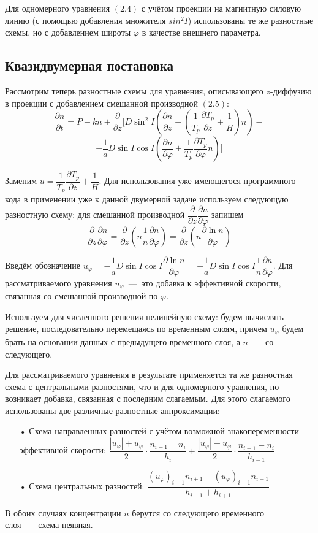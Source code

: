 \documentclass[14pt, a4paper, fleqn]{extarticle}
\begin{document}
Для одномерного уравнения $(2.4)$ с учётом проекции на магнитную силовую линию (с помощью добавления множителя $sin^2 I$) использованы те же разностные схемы, но с добавлением широты $\varphi$ в качестве внешнего параметра.



\subsection{Квазидвумерная постановка}

Рассмотрим теперь разностные схемы для уравнения, описывающего $z$-диффузию в проекции с добавлением смешанной производной $(2.5)$:$$\dfrac{\partial n}{\partial t} =P-kn+\dfrac{\partial}{\partial z}\biggl[D\sin^2 I\left(\dfrac{\partial n}{\partial z}+\left(\dfrac{1}{T_p}\dfrac{\partial T_p}{\partial z}+\dfrac{1}{H}\right)n\right)-$$ $$-\dfrac{1}{a}D\sin I\cos I\left(\dfrac{\partial n}{\partial\varphi}+\dfrac{1}{T_p}\dfrac{\partial T_p}{\partial\varphi}n\right)\biggr]$$

Заменим $u = \dfrac{1}{T_p}\dfrac{\partial T_p}{\partial z}+\dfrac{1}{H}$. Для использования уже имеющегося программного кода в применении уже к данной двумерной задаче используем следующую разностную схему: для смешанной производной $\dfrac{\partial}{\partial z}\dfrac{\partial n}{\partial \varphi}$ запишем $$\dfrac{\partial}{\partial z}\dfrac{\partial n}{\partial \varphi}=\dfrac{\partial}{\partial z}\left(n\dfrac{1}{n}\dfrac{\partial n}{\partial \varphi}\right) = \dfrac{\partial}{\partial z}\left(n\dfrac{\partial \ln n}{\partial \varphi}\right)$$

Введём обозначение $u_\varphi=-\dfrac{1}{a}D\sin I \cos I\dfrac{\partial \ln n}{\partial \varphi}=-\dfrac{1}{a}D\sin I \cos I\dfrac{1}{n}\dfrac{\partial n}{\partial \varphi}.$ Для рассматриваемого уравнения $u_\varphi$~---~это добавка к эффективной скорости, связанная со смешанной производной по $\varphi$.

Используем для численного решения нелинейную схему: будем вычислять решение, последовательно перемещаясь по временным слоям, причем $u_\varphi$ будем брать на основании данных с предыдущего временного слоя, а $n$~---~со следующего.

Для рассматриваемого уравнения в результате применяется та же разностная схема с центральными разностями, что и для одномерного уравнения, но возникает добавка, связанная с последним слагаемым. Для этого слагаемого использованы две различные разностные аппроксимации:
\begin{itemize}
\item[•] Схема направленных разностей с учётом возможной знакопеременности эффективной скорости: $\dfrac{|u_\varphi|+u_\varphi}{2}\cdot\dfrac{n_{i+1}-n_i}{h_i} + \dfrac{|u_\varphi|-u_\varphi}{2}\cdot\dfrac{n_{i-1}-n_i}{h_{i-1}}$
\item[•] Схема центральных разностей: $\dfrac{(u_\varphi)_{i+1}n_{i+1}-(u_\varphi)_{i-1}n_{i-1}}{h_{i-1}+h_{i+1}}$
\end{itemize}
В обоих случаях концентрации $n$ берутся со следующего временного слоя~---~схема неявная.
\end{document}

